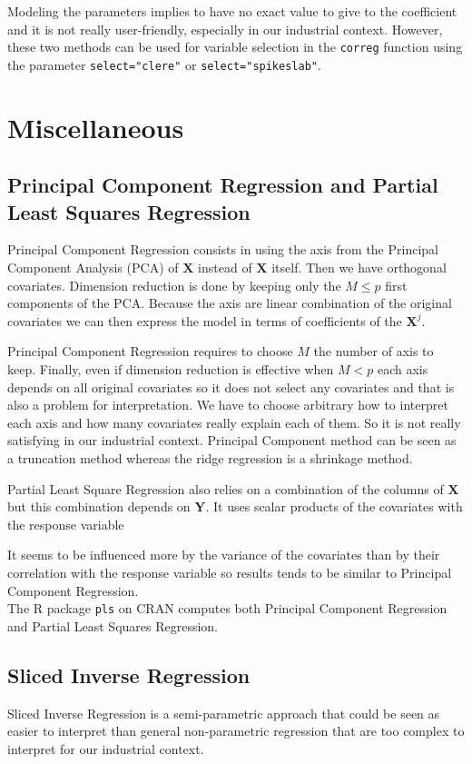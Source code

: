 \documentclass[12pt,a4paper]{report}
\begin{document}
		Modeling the parameters implies to have no exact value to give to the coefficient and it is not really user-friendly, especially in our industrial context. However, these two methods can be used for variable selection in the {\tt correg} function using the parameter {\tt select="clere"} or {\tt select="spikeslab"}.
		
		\FloatBarrier
	\section{Miscellaneous}	
	\subsection{Principal Component Regression and Partial Least Squares Regression}
	Principal Component Regression \cite{jackson2005user} consists in using the axis from the Principal Component Analysis (PCA) of $\boldsymbol{X}$ instead of $\boldsymbol{X}$ itself. Then we have orthogonal covariates. Dimension reduction is done by keeping only the $M \leq p$ first components of the PCA. Because the axis are linear combination of the original covariates we can then express the model in terms of coefficients of the $\boldsymbol{X}^j$.
	
	Principal Component Regression requires to choose $M$ the number of axis to keep. Finally, even if dimension reduction is effective when $M<p$ each axis depends on all original covariates so it does not select any covariates and that is also a problem for interpretation. We have to choose arbitrary how to interpret each axis and how many covariates really explain each of them. So it is not really satisfying in our industrial context. Principal Component method can be seen as a truncation method whereas the ridge regression is a shrinkage method. 
	
	Partial Least Square Regression \cite{abdi2003partial,geladi1986partial} also relies on a combination of the columns of  $\boldsymbol{X}$ but this combination depends on $\boldsymbol{Y}$.
		It uses scalar products of the covariates with the response variable
		
	It seems to be influenced more by the variance of the covariates than by their correlation with the response variable so results tends to be similar to Principal Component Regression.
	\\
	The R package {\tt pls} on CRAN computes both Principal Component Regression and Partial Least Squares Regression.
		
	\subsection{Sliced Inverse Regression}
		Sliced Inverse Regression is a semi-parametric approach that could be seen as easier to interpret than general non-parametric regression \cite{eubank1999nonparametric,hardle1990applied} that are too complex to interpret for our industrial context. \\
		
\end{document}
